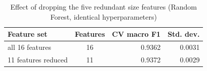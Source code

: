 \begin{table}[htbp]
\centering
\small
\caption{Effect of dropping the five redundant size features (Random Forest, identical hyperparameters)}
\label{tab:ablation}
\begin{tabular}{lcrr}
\toprule
Feature set & Features & CV macro F1 & Std. dev. \\
\midrule
all 16 features & 16 & 0.9362 & 0.0031 \\
11 features reduced & 11 & 0.9372 & 0.0029 \\
\bottomrule
\end{tabular}
\end{table}
